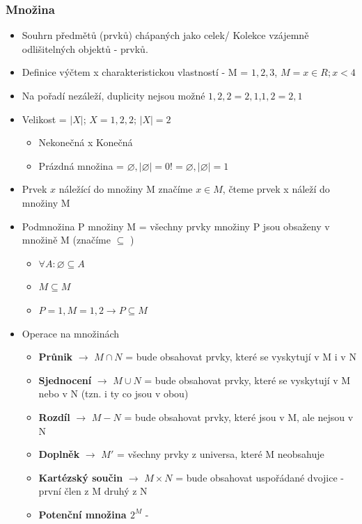 \documentclass[10pt,a4paper]{article}
\begin{document}
\subsubsection{Množina}
\begin{itemize}
\item Souhrn předmětů (prvků) chápaných jako celek/ Kolekce vzájemně odlišitelných objektů - prvků.
\item Definice výčtem x charakteristickou vlastností - M = ${1,2,3}$, $M = {x\in R; x<4}$
\item Na pořadí nezáleží, duplicity nejsou možné ${1,2,2}={2,1}$,${1,2}={2,1}$
\item Velikost = $|X|$; $X = {1,2,2}$; $|X| = 2$
\begin{itemize}
\item Nekonečná x Konečná
\item Prázdná množina = $\varnothing ,|\varnothing | = 0 != {\varnothing }, |{\varnothing }| = 1$
\end{itemize}
\item Prvek $x$ náležící do množiny M značíme $x \in M$, čteme prvek x náleží do množiny M
\item Podmnožina P množiny M = všechny prvky množiny P jsou obsaženy v množině M (značíme $\subseteq$ )
\begin{itemize}
\item $\forall  A: \varnothing  \subseteq  A$
\item $M\subseteq M$
\item $P={1}, M={1,2} \rightarrow P\subseteq M$
\end{itemize}
\item Operace na množinách
\begin{itemize}
\item \textbf{Průnik} $\rightarrow$ $M \cap N$ = bude obsahovat prvky, které se vyskytují v M i v N
\item \textbf{Sjednocení} $\rightarrow$ $M \cup N$ = bude obsahovat prvky, které se vyskytují v M nebo v N (tzn. i ty co jsou v obou)
\item \textbf{Rozdíl} $\rightarrow$ $M - N$ = bude obsahovat prvky, které jsou v M, ale nejsou v N
\item \textbf{Doplněk} $\rightarrow$ $M'$ = všechny prvky z universa, které M neobsahuje
\item \textbf{Kartézský součin } $\rightarrow$ $M \times N$ = bude obsahovat uspořádané dvojice - první člen z M druhý z N
\item \textbf{Potenční množina $2^M$} -
\end{itemize}
\end{itemize}
\end{document}
